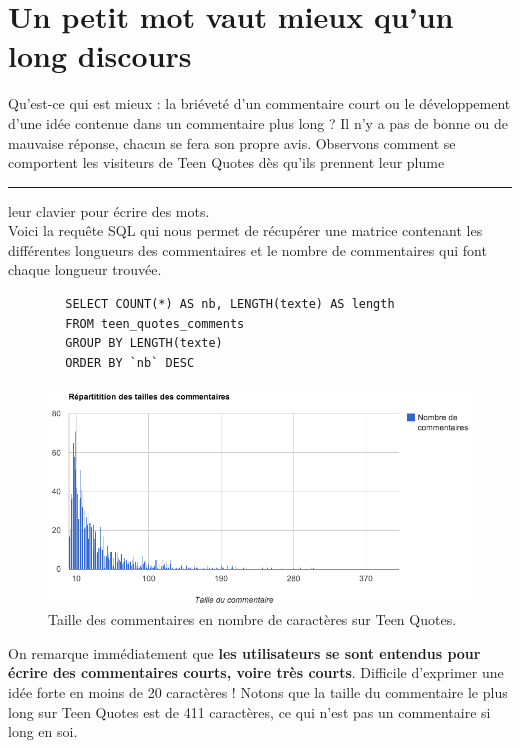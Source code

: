 \documentclass{report}
\newlength{\textlarg}
\newcommand{\barre}[1]{%
   \settowidth{\textlarg}{#1}
   #1\hspace{-\textlarg}\rule[0.5ex]{\textlarg}{0.5pt}}
\begin{document}
	\section{Un petit mot vaut mieux qu'un long discours}
	Qu'est-ce qui est mieux : la briéveté d'un commentaire court ou le développement d'une idée contenue dans un commentaire plus long ? Il n'y a pas de bonne ou de mauvaise réponse, chacun se fera son propre avis. Observons comment se comportent les visiteurs de Teen Quotes dès qu'ils prennent \barre{leur plume} leur clavier pour écrire des mots.\\

	Voici la requête SQL qui nous permet de récupérer une matrice contenant les différentes longueurs des commentaires et le nombre de commentaires qui font chaque longueur trouvée.

	\begin{lstlisting}
		SELECT COUNT(*) AS nb, LENGTH(texte) AS length
		FROM teen_quotes_comments 
		GROUP BY LENGTH(texte)
		ORDER BY `nb` DESC
	\end{lstlisting}

	\begin{figure}[H]
		\center
		\includegraphics[width=470px]{images/tailleCommentaires.png}
		\caption{Taille des commentaires en nombre de caractères sur Teen Quotes.}
	\end{figure}

	On remarque immédiatement que \textbf{les utilisateurs se sont entendus pour écrire des commentaires courts, voire très courts}. Difficile d'exprimer une idée forte en moins de 20 caractères ! Notons que la taille du commentaire le plus long sur Teen Quotes est de 411 caractères, ce qui n'est pas un commentaire si long en soi.\\
\end{document}

